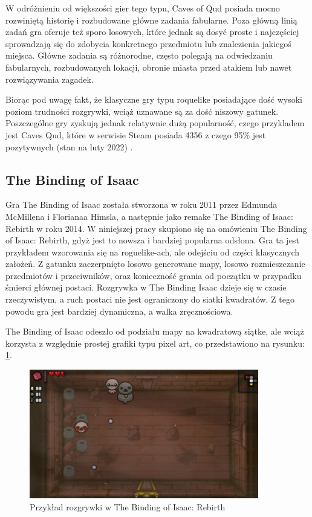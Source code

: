 \documentclass[12pt,twoside]{article}
\begin{document}
W odróżnieniu od większości gier tego typu, Caves of Qud posiada mocno rozwiniętą historię i rozbudowane główne zadania fabularne. Poza główną linią zadań gra oferuje też sporo losowych, które jednak są dosyć proste i najczęściej sprowadzają się do zdobycia konkretnego przedmiotu lub znalezienia jakiegoś miejsca. Główne zadania są różnorodne, często polegają na odwiedzaniu fabularnych, rozbudowanych lokacji, obronie miasta przed atakiem lub nawet rozwiązywania zagadek.

Biorąc pod uwagę fakt, że klasyczne gry typu roquelike posiadające dość wysoki poziom trudności rozgrywki, wciąż uznawane są za dość niszowy gatunek. Poszczególne gry zyskują jednak relatywnie dużą popularność, czego przykladem jest Caves Qud, które w serwisie Steam posiada 4356 z czego 95\% jest pozytywnych (stan na luty 2022) \cite{coq_steam}.



\subsection{The Binding of Isaac}

Gra The Binding of Isaac została stworzona w roku 2011 przez Edmunda McMillena i Florianaa Himsla, a następnie jako remake The Binding of Isaac: Rebirth w roku 2014. W niniejszej pracy skupiono się na omówieniu The Binding of Isaac: Rebirth, gdyż jest to nowsza i bardziej popularna odsłona. Gra ta jest przykładem wzorowania się na roguelike-ach, ale odejściu od części klasycznych założeń. Z gatunku zaczerpnięto losowo generowane mapy, losowo rozmieszczanie przedmiotów i przeciwników, oraz konieczność grania od początku w przypadku śmierci głównej postaci. Rozgrywka w The Binding Isaac dzieje się w czasie rzeczywistym, a ruch postaci nie jest ograniczony do siatki kwadratów. Z tego powodu gra jest bardziej dynamiczna, a walka zręcznościowa.

The Binding of Isaac odeszło od podziału mapy na kwadratową siątke, ale wciąż korzysta z względnie prostej grafiki typu pixel art, co przedstawiono na rysunku: \ref{tboi:scr1}.

\FloatBarrier
\begin{figure}[h]
	\centering
	\includegraphics[width=10cm]{images/tboi/scr1.png}
	\caption{Przykład rozgrywki w The Binding of Isaac: Rebirth}
	\label{tboi:scr1}
\end{figure}
\FloatBarrier
\end{document}
